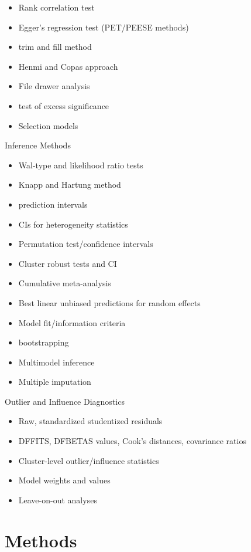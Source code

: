 \documentclass[
]{book}
\begin{document}
\begin{itemize}
\item
  Rank correlation test
\item
  Egger's regression test (PET/PEESE methods)
\item
  trim and fill method
\item
  Henmi and Copas approach
\item
  File drawer analysis
\item
  test of excess significance
\item
  Selection models
\end{itemize}

Inference Methods

\begin{itemize}
\item
  Wal-type and likelihood ratio tests
\item
  Knapp and Hartung method
\item
  prediction intervals
\item
  CIs for heterogeneity statistics
\item
  Permutation test/confidence intervals
\item
  Cluster robust tests and CI
\item
  Cumulative meta-analysis
\item
  Best linear unbiased predictions for random effects
\item
  Model fit/information criteria
\item
  bootstrapping
\item
  Multimodel inference
\item
  Multiple imputation
\end{itemize}

Outlier and Influence Diagnostics

\begin{itemize}
\item
  Raw, standardized studentized residuals
\item
  DFFITS, DFBETAS values, Cook's distances, covariance ratios
\item
  Cluster-level outlier/influence statistics
\item
  Model weights and values
\item
  Leave-on-out analyses
\end{itemize}

\hypertarget{methods}{%
\chapter{Methods}\label{methods}}
\end{document}
